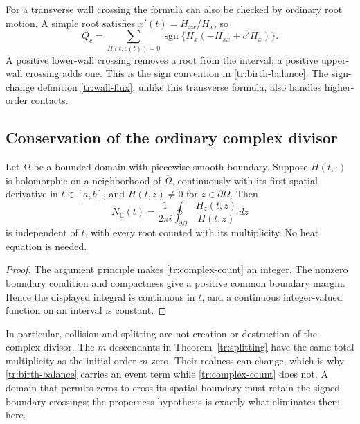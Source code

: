 For a transverse wall crossing the formula can also be checked by
ordinary root motion.  A simple root satisfies
$x'(t)=H_{xx}/H_x$, so
\[
 Q_c=\sum_{H(t,c(t))=0}
       \operatorname{sgn}\{H_x(-H_{xx}+c'H_x)\}.
\]
A positive lower-wall crossing removes a root from the interval; a
positive upper-wall crossing adds one.  This is the sign convention in
\eqref{tr:birth-balance}.  The sign-change definition
\eqref{tr:wall-flux}, unlike this transverse formula, also handles
higher-order contacts.

\subsection{Conservation of the ordinary complex divisor}

\begin{proposition}
\label{tr:complex-conservation}
Let $\Omega$ be a bounded domain with piecewise smooth boundary.  Suppose
$H(t,\cdot)$ is holomorphic on a neighborhood of $\overline\Omega$,
continuously with its first spatial derivative in $t\in[a,b]$, and
$H(t,z)\ne0$ for $z\in\partial\Omega$.  Then
\begin{equation}\label{tr:complex-count}
 N_{\mathbb C}(t)=\frac1{2\pi i}\oint_{\partial\Omega}
                                      \frac{H_z(t,z)}{H(t,z)}\,dz
\end{equation}
is independent of $t$, with every root counted with its multiplicity.
No heat equation is needed.
\end{proposition}

\begin{proof}
The argument principle makes \eqref{tr:complex-count} an integer.  The
nonzero boundary condition and compactness give a positive common
boundary margin.  Hence the displayed integral is continuous in $t$,
and a continuous integer-valued function on an interval is constant.
\end{proof}

In particular, collision and splitting are not creation or destruction
of the complex divisor.  The $m$ descendants in
Theorem~\ref{tr:splitting} have the same total multiplicity as the
initial order-$m$ zero.  Their realness can change, which is why
\eqref{tr:birth-balance} carries an event term while
\eqref{tr:complex-count} does not.  A domain that permits zeros to cross
its spatial boundary must retain the signed boundary crossings; the
properness hypothesis is exactly what eliminates them here.


